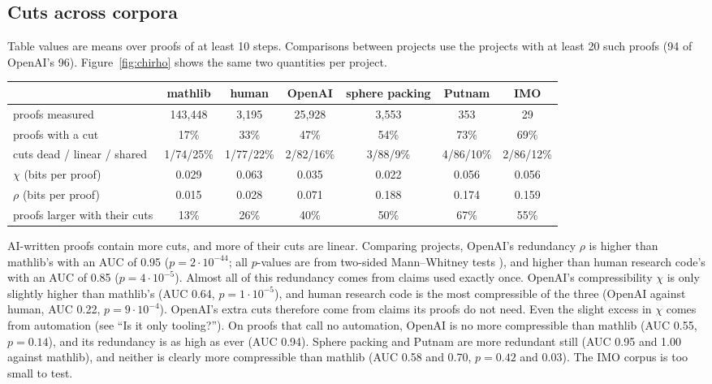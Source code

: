 \documentclass{article}
\begin{document}
\subsection{Cuts across corpora}
Table values are means over proofs of at least 10 steps. Comparisons between projects use the projects with at least
20 such proofs (94 of OpenAI's 96). Figure~\ref{fig:chirho} shows the same two quantities per
project.
\begin{center}
\small
\begin{tabular}{lcccccc}
 & mathlib & human & OpenAI & sphere packing & Putnam & IMO \\
\hline
proofs measured & 143,448 & 3,195 & 25,928 & 3,553 & 353 & 29 \\
proofs with a cut & 17\% & 33\% & 47\% & 54\% & 73\% & 69\% \\
cuts dead / linear / shared & 1/74/25\% & 1/77/22\% & 2/82/16\% & 3/88/9\% & 4/86/10\% & 2/86/12\% \\
$\chi$ (bits per proof) & 0.029 & 0.063 & 0.035 & 0.022 & 0.056 & 0.056 \\
$\rho$ (bits per proof) & 0.015 & 0.028 & 0.071 & 0.188 & 0.174 & 0.159 \\
proofs larger with their cuts & 13\% & 26\% & 40\% & 50\% & 67\% & 55\% \\
\end{tabular}
\end{center}
AI-written proofs contain more cuts, and more of their cuts are linear. Comparing projects, OpenAI's redundancy $\rho$ is
higher than mathlib's with an AUC of 0.95 ($p=2\cdot 10^{-44}$; all $p$-values are from two-sided Mann--Whitney
tests \textit{\parencite{mann1947}}), and higher than human research code's with an AUC of
0.85 ($p=4\cdot 10^{-5}$). Almost all of this redundancy comes from claims used exactly once. OpenAI's compressibility
$\chi$ is only slightly higher than mathlib's (AUC 0.64, $p=1\cdot 10^{-5}$), and human research code is the most compressible of the three (OpenAI against
human, AUC 0.22, $p=9\cdot 10^{-4}$). OpenAI's extra cuts therefore come from claims its proofs do not need. Even the slight excess in $\chi$ comes from
automation (see ``Is it only tooling?''). On proofs that call no automation, OpenAI is no more compressible
than mathlib (AUC 0.55, $p=0.14$), and its redundancy is as high as ever (AUC 0.94). Sphere packing and Putnam are more redundant still (AUC 0.95 and 1.00 against mathlib), and
neither is clearly more compressible than mathlib (AUC 0.58 and 0.70, $p=0.42$ and $0.03$). The IMO corpus is too small to test.
\end{document}
